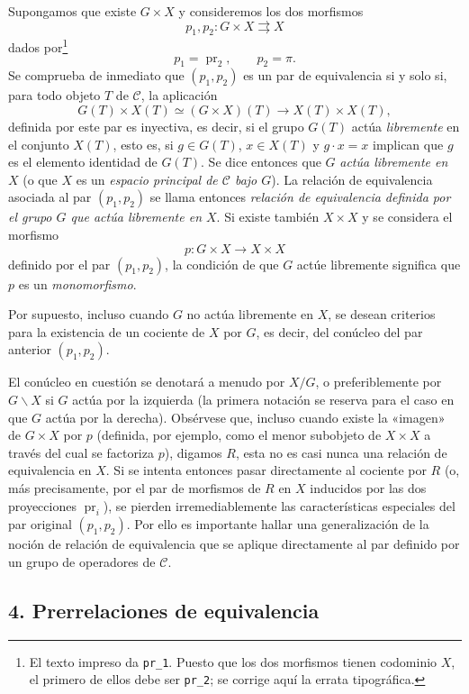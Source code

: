 Supongamos que existe $G\times X$ y consideremos los dos morfismos
\[
  p_1,p_2:G\times X\rightrightarrows X
\]
dados por\footnote{El texto impreso da \texttt{pr\_1}. Puesto que los dos
morfismos tienen codominio $X$, el primero de ellos debe ser
\texttt{pr\_2}; se corrige aquí la errata tipográfica.}
\[
  p_1=\operatorname{pr}_2,\qquad p_2=\pi.
\]
Se comprueba de inmediato que $(p_1,p_2)$ es un par de equivalencia si y solo
si, para todo objeto $T$ de $\mathcal C$, la aplicación
\[
  G(T)\times X(T)\simeq(G\times X)(T)
  \longrightarrow X(T)\times X(T),
\]
definida por este par es inyectiva, es decir, si el grupo $G(T)$ actúa
\emph{libremente} en el conjunto $X(T)$, esto es, si $g\in G(T)$,
$x\in X(T)$ y $g\cdot x=x$ implican que $g$ es el elemento identidad de
$G(T)$. Se dice entonces que $G$ \emph{actúa libremente en $X$} (o que $X$ es
un \emph{espacio principal de $\mathcal C$ bajo $G$}). La relación de
equivalencia asociada al par $(p_1,p_2)$ se llama entonces \emph{relación de
equivalencia definida por el grupo $G$ que actúa libremente en $X$}. Si existe
también $X\times X$ y se considera el morfismo
\[
  p:G\times X\longrightarrow X\times X
\]
definido por el par $(p_1,p_2)$, la condición de que $G$ actúe libremente
significa que $p$ es un \emph{monomorfismo}.

Por supuesto, incluso cuando $G$ no actúa libremente en $X$, se desean
criterios para la existencia de un cociente de $X$ por $G$, es decir, del
conúcleo del par anterior $(p_1,p_2)$.

El conúcleo en cuestión se denotará a menudo por $X/G$, o preferiblemente por
$G\backslash X$ si $G$ actúa por la izquierda (la primera notación se reserva
para el caso en que $G$ actúa por la derecha). Obsérvese que, incluso cuando
existe la «imagen» de $G\times X$ por $p$ (definida, por ejemplo, como el
menor subobjeto de $X\times X$ a través del cual se factoriza $p$), digamos
$R$, esta no es casi nunca una relación de equivalencia en $X$. Si se intenta
entonces pasar directamente al cociente por $R$ (o, más precisamente, por el
par de morfismos de $R$ en $X$ inducidos por las dos proyecciones
$\operatorname{pr}_i$), se pierden irremediablemente las características
especiales del par original $(p_1,p_2)$. Por ello es importante hallar una
generalización de la noción de relación de equivalencia que se aplique
directamente al par definido por un grupo de operadores de $\mathcal C$.

\subsection*{4. Prerrelaciones de equivalencia}

